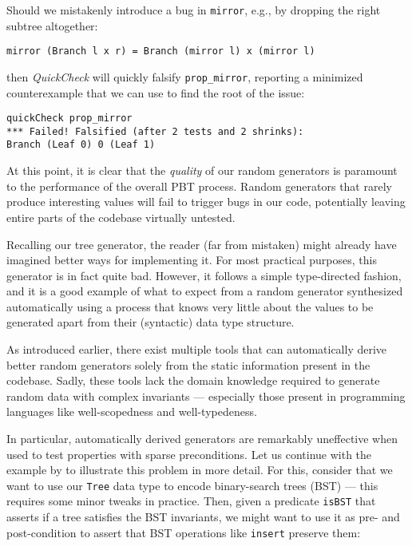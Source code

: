 \documentclass[acmsmall, anonymous]{acmart}
\newcommand{\quickcheck}{\textit{QuickCheck}\xspace}
\begin{document}
\noindent Should we mistakenly introduce a bug in \texttt{mirror}, e.g., by
dropping the right subtree altogether:

\begin{verbatim}
mirror (Branch l x r) = Branch (mirror l) x (mirror l)
\end{verbatim}

\noindent then \quickcheck will quickly falsify \texttt{prop\_mirror}, reporting
a minimized counterexample that we can use to find the root of the issue:

\begin{verbatim}
quickCheck prop_mirror
*** Failed! Falsified (after 2 tests and 2 shrinks):
Branch (Leaf 0) 0 (Leaf 1)
\end{verbatim}

At this point, it is clear that the \emph{quality} of our random generators is
paramount to the performance of the overall PBT process.
%
Random generators that rarely produce interesting values will fail to trigger
bugs in our code, potentially leaving entire parts of the codebase virtually
untested.


Recalling our tree generator, the reader (far from mistaken) might already have
imagined better ways for implementing it.
%
For most practical purposes, this generator is in fact quite bad.
%
However, it follows a simple type-directed fashion, and it is a good example of
what to expect from a random generator synthesized automatically using a process
that knows very little about the values to be generated apart from their
(syntactic) data type structure.

As introduced earlier, there exist multiple tools that can automatically derive
better random generators solely from the static information present in the
codebase.
%
%
Sadly, these tools lack the domain knowledge required to generate random data
with complex invariants --- especially those present in programming languages
like well-scopedness and well-typedeness.


In particular, automatically derived generators are remarkably uneffective when
used to test properties with sparse preconditions.
%
Let us continue with the example by \citeauthor{lampropoulos2019coverage} to
illustrate this problem in more detail.
%
For this, consider that we want to use our \texttt{Tree} data type to encode
binary-search trees (BST) --- this requires some minor tweaks in practice.
%
Then, given a predicate \texttt{isBST} that asserts if a tree satisfies the BST
invariants, we might want to use it as pre- and post-condition to assert that
BST operations like \texttt{insert} preserve them:
\end{document}

